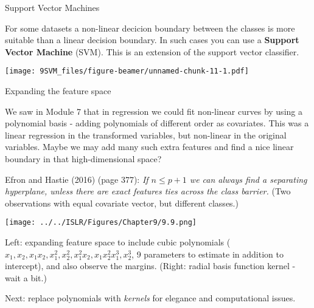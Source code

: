 \documentclass[10pt,ignorenonframetext,]{beamer}
\begin{document}
\begin{frame}{Support Vector Machines}

For some datasets a non-linear decicion boundary between the classes is
more suitable than a linear decision boundary. In such cases you can use
a \textbf{Support Vector Machine} (SVM). This is an extension of the
support vector classifier.

\texttt{[image: 9SVM\_files/figure-beamer/unnamed-chunk-11-1.pdf]}

\end{frame}

\begin{frame}

\begin{block}{Expanding the feature space}

We saw in Module 7 that in regression we could fit non-linear curves by
using a polynomial basis - adding polynomials of different order as
covariates. This was a linear regression in the transformed variables,
but non-linear in the original variables. Maybe we may add many such
extra features and find a nice linear boundary in that high-dimensional
space?

Efron and Hastie (2016) (page 377): \emph{If \(n \le p+1\) we can always
find a separating hyperplane, unless there are exact features ties
across the class barrier.} (Two observations with equal covariate
vector, but different classes.)

\end{block}

\end{frame}

\begin{frame}

\texttt{[image: ../../ISLR/Figures/Chapter9/9.9.png]}

Left: expanding feature space to include cubic polynomials
(\(x_1,x_2,x_1x_2,x_1^2,x_2^2,x_1^2x_2,x_1x_2^2x_1^3,x_2^3\), 9
parameters to estimate in addition to intercept), and also observe the
margins. (Right: radial basis function kernel - wait a bit.)

Next: replace polynomials with \emph{kernels} for elegance and
computational issues.

\end{frame}
\end{document}
